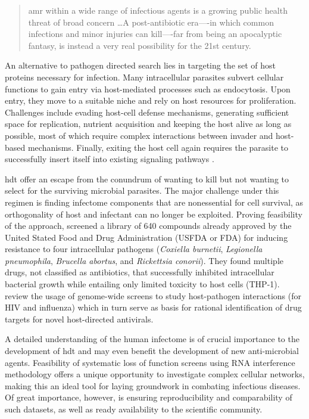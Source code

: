 \begin{quote}
\Gls{amr} within a wide range of infectious agents is a growing public health threat of broad concern \ldots A post-antibiotic era—-in which common infections and minor injuries can kill—-far from being an apocalyptic fantasy, is instead a very real possibility for the 21st century.
\end{quote}

An alternative to pathogen directed search lies in targeting the set of host proteins necessary for infection. Many intracellular parasites subvert cellular functions to gain entry via host-mediated processes such as endocytosis. Upon entry, they move to a suitable niche and rely on host resources for proliferation. Challenges include evading host-cell defense mechanisms, generating sufficient space for replication, nutrient acquisition and keeping the host alive as long as possible, most of which require complex interactions between invader and host-based mechanisms. Finally, exiting the host cell again requires the parasite to successfully insert itself into existing signaling pathways \citep{Leiriao2004}.

\Gls{hdt} offer an escape from the conundrum of wanting to kill but not wanting to select for the surviving microbial parasites. The major challenge under this regimen is finding infectome components that are nonessential for cell survival, as orthogonality of host and infectant can no longer be exploited. Proving feasibility of the approach, \citeauthor{Czyz2014} screened a library of 640 compounds already approved by the United Stated Food and Drug Administration (USFDA or FDA) for inducing resistance to four intracellular pathogens (\textit{Coxiella burnetii}, \textit{Legionella pneumophila}, \textit{Brucella abortus}, and \textit{Rickettsia conorii}). They found multiple drugs, not classified as antibiotics, that successfully inhibited intracellular bacterial growth while entailing only limited toxicity to host cells (THP-1). \citeauthor{Prussia2011} review the usage of genome-wide screens to study host-pathogen interactions (for HIV and influenza) which in turn serve as basis for rational identification of drug targets for novel host-directed antivirals. \nocite{Hawn2015}

A detailed understanding of the human infectome is of crucial importance to the development of \gls{hdt} and may even benefit the development of new anti-microbial agents. Feasibility of systematic loss of function screens using RNA interference methodology offers a unique opportunity to investigate complex cellular networks, making this an ideal tool for laying groundwork in combating infectious diseases. Of great importance, however, is ensuring reproducibility and comparability of such datasets, as well as ready availability to the scientific community.
